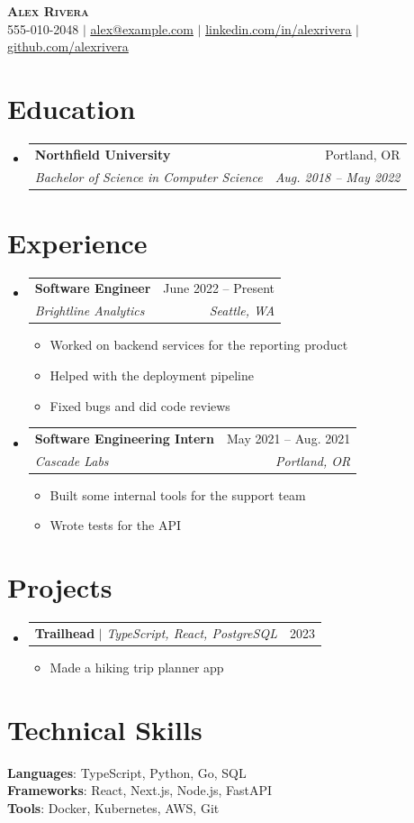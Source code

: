 \documentclass[letterpaper,11pt]{article}
\makeatletter
\newcommand{\resumeItem}[1]{
  \item\small{
    {#1 \vspace{-2pt}}
  }
}
\newcommand{\resumeSubheading}[4]{
  \vspace{-2pt}\item
    \begin{tabular*}{0.97\textwidth}[t]{l@{\extracolsep{\fill}}r}
      \textbf{#1} & #2 \\
      \textit{\small#3} & \textit{\small #4} \\
    \end{tabular*}\vspace{-7pt}
}
\newcommand{\resumeProjectHeading}[2]{
    \item
    \begin{tabular*}{0.97\textwidth}{l@{\extracolsep{\fill}}r}
      \small#1 & #2 \\
    \end{tabular*}\vspace{-7pt}
}
\newcommand{\resumeSubHeadingListStart}{\begin{itemize}[leftmargin=0.15in, label={}]}
\newcommand{\resumeSubHeadingListEnd}{\end{itemize}}
\newcommand{\resumeItemListStart}{\begin{itemize}}
\newcommand{\resumeItemListEnd}{\end{itemize}\vspace{-5pt}}
\makeatother
\begin{document}
\begin{center}
    \textbf{\Huge \scshape Alex Rivera} \\ \vspace{1pt}
    \small 555-010-2048 $|$ \href{mailto:alex@example.com}{\underline{alex@example.com}} $|$
    \href{https://linkedin.com/in/alexrivera}{\underline{linkedin.com/in/alexrivera}} $|$
    \href{https://github.com/alexrivera}{\underline{github.com/alexrivera}}
\end{center}


\section{Education}
  \resumeSubHeadingListStart
    \resumeSubheading
      {Northfield University}{Portland, OR}
      {Bachelor of Science in Computer Science}{Aug. 2018 -- May 2022}
  \resumeSubHeadingListEnd


\section{Experience}
  \resumeSubHeadingListStart

    \resumeSubheading
      {Software Engineer}{June 2022 -- Present}
      {Brightline Analytics}{Seattle, WA}
      \resumeItemListStart
        \resumeItem{Worked on backend services for the reporting product}
        \resumeItem{Helped with the deployment pipeline}
        \resumeItem{Fixed bugs and did code reviews}
      \resumeItemListEnd

    \resumeSubheading
      {Software Engineering Intern}{May 2021 -- Aug. 2021}
      {Cascade Labs}{Portland, OR}
      \resumeItemListStart
        \resumeItem{Built some internal tools for the support team}
        \resumeItem{Wrote tests for the API}
      \resumeItemListEnd

  \resumeSubHeadingListEnd


\section{Projects}
    \resumeSubHeadingListStart
      \resumeProjectHeading
          {\textbf{Trailhead} $|$ \emph{TypeScript, React, PostgreSQL}}{2023}
          \resumeItemListStart
            \resumeItem{Made a hiking trip planner app}
          \resumeItemListEnd
    \resumeSubHeadingListEnd


\section{Technical Skills}
 \begin{itemize}[leftmargin=0.15in, label={}]
    \small{\item{
     \textbf{Languages}{: TypeScript, Python, Go, SQL} \\
     \textbf{Frameworks}{: React, Next.js, Node.js, FastAPI} \\
     \textbf{Tools}{: Docker, Kubernetes, AWS, Git}
    }}
 \end{itemize}
\end{document}

